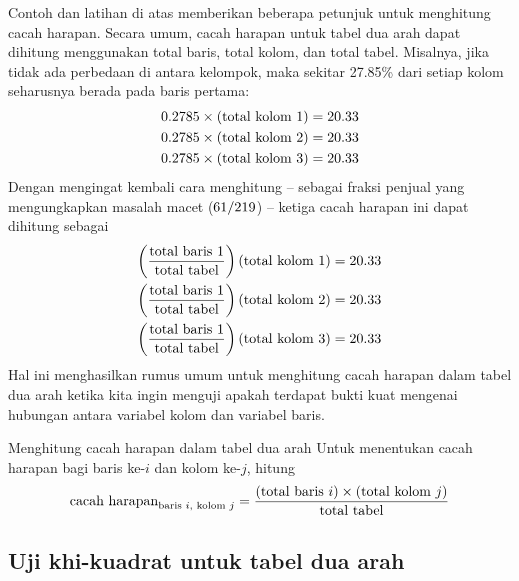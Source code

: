 Contoh dan latihan di atas memberikan beberapa petunjuk
untuk menghitung cacah harapan.
Secara umum, cacah harapan untuk tabel dua arah dapat
dihitung menggunakan total baris, total kolom,
dan total tabel.
Misalnya, jika tidak ada perbedaan di antara kelompok,
maka sekitar 27.85\% dari setiap kolom seharusnya berada pada baris pertama:
\begin{align*}
0.2785{}\times (\text{total kolom 1}) &= 20.33{} \\
0.2785{}\times (\text{total kolom 2}) &= 20.33{} \\
0.2785{}\times (\text{total kolom 3}) &= 20.33{}
\end{align*}
Dengan mengingat kembali cara menghitung \iPodAFraction{} --
sebagai fraksi penjual yang mengungkapkan masalah macet
($61{}/219{}$) --
ketiga cacah harapan ini dapat dihitung sebagai
\begin{align*}
\left(\frac{\text{total baris 1}}{\text{total tabel}}\right)
    \text{(total kolom 1)} &= 20.33{} \\
\left(\frac{\text{total baris 1}}{\text{total tabel}}\right)
    \text{(total kolom 2)} &= 20.33{} \\
\left(\frac{\text{total baris 1}}{\text{total tabel}}\right)
    \text{(total kolom 3)} &= 20.33{}
\end{align*}
Hal ini menghasilkan rumus umum untuk menghitung cacah
harapan dalam tabel dua arah ketika kita ingin menguji apakah
terdapat bukti kuat mengenai hubungan antara variabel
kolom dan variabel baris.


\begin{onebox}{Menghitung cacah harapan dalam tabel dua arah}
  Untuk menentukan cacah harapan bagi baris ke-$i$
  dan kolom ke-$j$, hitung
  \begin{align*}
  \text{cacah harapan}_{\text{baris }i,\text{ kolom }j}
    = \frac{(\text{total baris $i$}) \times
        (\text{total kolom $j$})}{\text{total tabel}}\vspace{2mm}
  \end{align*}
\end{onebox}

%
\subsection{Uji khi-kuadrat untuk tabel dua arah}

